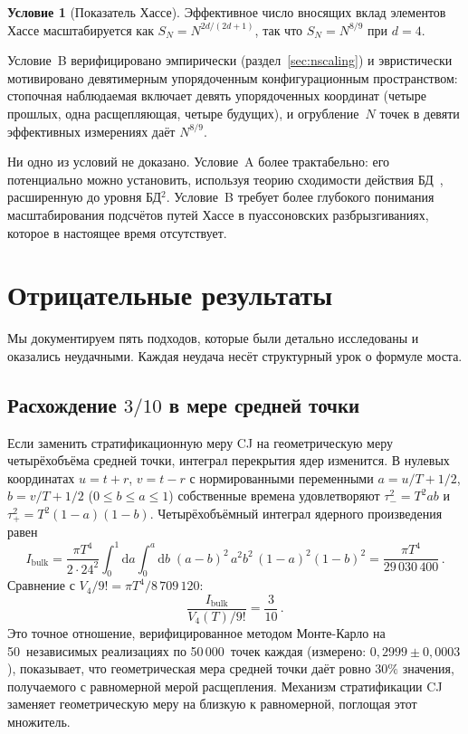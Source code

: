 \documentclass[12pt,a4paper]{article}
\theoremstyle{plain}
\theoremstyle{definition}
\newtheorem{condition}[theorem]{Условие}
\theoremstyle{remark}
\newcommand{\dd}{\mathrm{d}}
\begin{document}
\begin{condition}[Показатель Хассе]
\label{cond:B}
Эффективное число вносящих вклад элементов Хассе
масштабируется как
$S_N = N^{2d/(2d+1)}$, так что $S_N = N^{8/9}$ при $d = 4$.
\end{condition}

Условие~B верифицировано эмпирически
(раздел~\ref{sec:nscaling}) и эвристически мотивировано
девятимерным упорядоченным конфигурационным пространством:
стопочная наблюдаемая включает девять упорядоченных координат
(четыре прошлых, одна расщепляющая, четыре будущих), и
огрубление~$N$ точек в девяти эффективных измерениях даёт
$N^{8/9}$.

Ни одно из условий не доказано.  Условие~A более
трактабельно: его потенциально можно установить, используя
теорию сходимости действия БД~\cite{BenincasaDowker:2010},
расширенную до уровня БД${}^2$.  Условие~B требует более
глубокого понимания масштабирования подсчётов путей Хассе в
пуассоновских разбрызгиваниях, которое в настоящее время
отсутствует.

\section{Отрицательные результаты}
\label{sec:nogo}

Мы документируем пять подходов, которые были детально
исследованы и оказались неудачными.  Каждая неудача несёт
структурный урок о формуле моста.

\subsection{Расхождение $3/10$ в мере средней точки}
\label{sec:midpoint}

Если заменить стратификационную меру CJ на геометрическую
меру четырёхобъёма средней точки, интеграл перекрытия ядер
изменится.  В нулевых координатах $u = t+r$, $v = t-r$ с
нормированными переменными
$a = u/T + 1/2$, $b = v/T + 1/2$ ($0 \leq b \leq a \leq 1$)
собственные времена удовлетворяют $\tau_-^2 = T^2 ab$ и
$\tau_+^2 = T^2(1-a)(1-b)$.  Четырёхобъёмный интеграл
ядерного произведения равен
\begin{equation}\label{eq:Ibulk}
  I_{\mathrm{bulk}}
  = \frac{\pi T^4}{2 \cdot 24^2}
    \int_0^1 \dd a \int_0^a \dd b\;
    (a-b)^2\, a^2 b^2\, (1-a)^2 (1-b)^2
  = \frac{\pi T^4}{29\,030\,400}\,.
\end{equation}
Сравнение с $V_4/9! = \pi T^4/8\,709\,120$:
\begin{equation}\label{eq:three-tenths}
  \frac{I_{\mathrm{bulk}}}{V_4(T)/9!} = \frac{3}{10}\,.
\end{equation}
Это точное отношение, верифицированное методом Монте-Карло
на 50~независимых реализациях по 50\,000~точек каждая
(измерено: $0{,}2999 \pm 0{,}0003$), показывает, что
геометрическая мера средней точки даёт ровно $30\%$ значения,
получаемого с равномерной мерой расщепления.  Механизм
стратификации CJ заменяет геометрическую меру на близкую к
равномерной, поглощая этот множитель.
\end{document}
